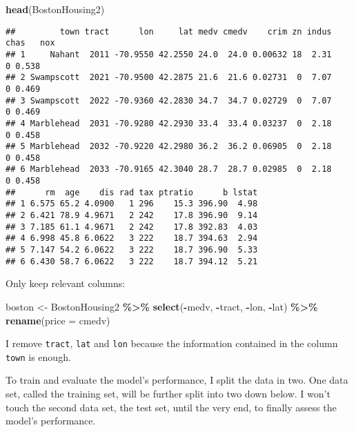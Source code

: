 \documentclass[
]{article}
\newenvironment{Shaded}{\begin{snugshade}}{\end{snugshade}}
\newcommand{\DataTypeTok}[1]{\textcolor[rgb]{0.13,0.29,0.53}{#1}}
\newcommand{\KeywordTok}[1]{\textcolor[rgb]{0.13,0.29,0.53}{\textbf{#1}}}
\newcommand{\NormalTok}[1]{#1}
\newcommand{\OperatorTok}[1]{\textcolor[rgb]{0.81,0.36,0.00}{\textbf{#1}}}
\newcommand{\StringTok}[1]{\textcolor[rgb]{0.31,0.60,0.02}{#1}}
\begin{document}
\begin{Shaded}
\begin{Highlighting}[]
\KeywordTok{head}\NormalTok{(BostonHousing2)}
\end{Highlighting}
\end{Shaded}

\begin{verbatim}
##         town tract      lon     lat medv cmedv    crim zn indus chas   nox
## 1     Nahant  2011 -70.9550 42.2550 24.0  24.0 0.00632 18  2.31    0 0.538
## 2 Swampscott  2021 -70.9500 42.2875 21.6  21.6 0.02731  0  7.07    0 0.469
## 3 Swampscott  2022 -70.9360 42.2830 34.7  34.7 0.02729  0  7.07    0 0.469
## 4 Marblehead  2031 -70.9280 42.2930 33.4  33.4 0.03237  0  2.18    0 0.458
## 5 Marblehead  2032 -70.9220 42.2980 36.2  36.2 0.06905  0  2.18    0 0.458
## 6 Marblehead  2033 -70.9165 42.3040 28.7  28.7 0.02985  0  2.18    0 0.458
##      rm  age    dis rad tax ptratio      b lstat
## 1 6.575 65.2 4.0900   1 296    15.3 396.90  4.98
## 2 6.421 78.9 4.9671   2 242    17.8 396.90  9.14
## 3 7.185 61.1 4.9671   2 242    17.8 392.83  4.03
## 4 6.998 45.8 6.0622   3 222    18.7 394.63  2.94
## 5 7.147 54.2 6.0622   3 222    18.7 396.90  5.33
## 6 6.430 58.7 6.0622   3 222    18.7 394.12  5.21
\end{verbatim}

Only keep relevant columns:

\begin{Shaded}
\begin{Highlighting}[]
\NormalTok{boston \textless{}{-}}\StringTok{ }\NormalTok{BostonHousing2 }\OperatorTok{\%\textgreater{}\%}\StringTok{ }
\StringTok{    }\KeywordTok{select}\NormalTok{(}\OperatorTok{{-}}\NormalTok{medv, }\OperatorTok{{-}}\NormalTok{tract, }\OperatorTok{{-}}\NormalTok{lon, }\OperatorTok{{-}}\NormalTok{lat) }\OperatorTok{\%\textgreater{}\%}\StringTok{ }
\StringTok{    }\KeywordTok{rename}\NormalTok{(}\DataTypeTok{price =}\NormalTok{ cmedv)}
\end{Highlighting}
\end{Shaded}

I remove \texttt{tract}, \texttt{lat} and \texttt{lon} because the information contained in the column \texttt{town} is enough.

To train and evaluate the model's performance, I split the data in two.
One data set, called the training set, will be further split into two down below. I won't
touch the second data set, the test set, until the very end, to finally assess the model's
performance.
\end{document}
